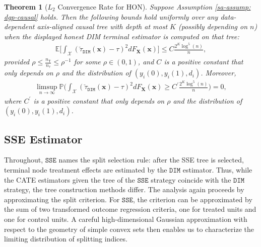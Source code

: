 \documentclass[10pt]{article}
\def\treeT{\mathsf{T}}
\def\bx{\mathbf{x}}
\def\bX{\mathbf{X}}
\def\X{\mathcal{X}}
\def\E{\mathbb{E}}
\def\P{\mathbb{P}}
\def\DIM{\mathtt{DIM}}
\def\SSE{\mathtt{SSE}}
\newtheorem{theorem}{Theorem}%
\theoremstyle{definition}
\theoremstyle{remark}
\begin{document}
\begin{theorem}[$L_2$ Convergence Rate for HON]\label{sa-thm: L2 consistency honest reg}
Suppose Assumption \ref{sa-assump: dgp-causal} holds. Then the following bounds hold uniformly over any data-dependent axis-aligned causal tree with depth at most $K$ (possibly depending on $n$) when the displayed honest DIM terminal estimator is computed on that tree:
\begin{align*}
    \E \bigg[ \int_{\X} (\check\tau_{\mathtt{DIM}}(\bx) - \tau)^2 dF_{\bX}(\bx)\bigg] \leq C \frac{2^K \log^5(n)}{n},
\end{align*}
provided $\rho \leq \frac{n_{\treeT}}{n_{\tau}} \leq \rho^{-1}$ for some $\rho \in (0,1)$, and $C$ is a positive constant that only depends on $\rho$ and the distribution of $(y_i(0), y_i(1), d_i)$. Moreover,
\begin{align*}
    \limsup_{n \to \infty} \P \bigg( \int_{\X} (\check\tau_{\mathtt{DIM}}(\bx) - \tau)^2 dF_{\bX}(\bx) \geq C^{\prime} \frac{2^K \log^5(n)}{n} \bigg) = 0,
\end{align*}
where $C^{\prime}$ is a positive constant that only depends on $\rho$ and the distribution of $(y_i(0), y_i(1), d_i)$.
\end{theorem}

\subsection{SSE Estimator}\label{sa-sec: sse causal}

Throughout, $\SSE$ names the split selection rule: after the SSE tree is selected, terminal node treatment effects are estimated by the $\DIM$ estimator. Thus, while the CATE estimators given the tree of the $\SSE$ strategy coincide with the $\DIM$ strategy, the tree construction methods differ. The analysis again proceeds by approximating the split criterion. For $\SSE$, the criterion can be approximated by the sum of two transformed outcome regression criteria, one for treated units and one for control units. A careful high-dimensional Gaussian approximation with respect to the geometry of simple convex sets then enables us to characterize the limiting distribution of splitting indices.
 
\end{document}
